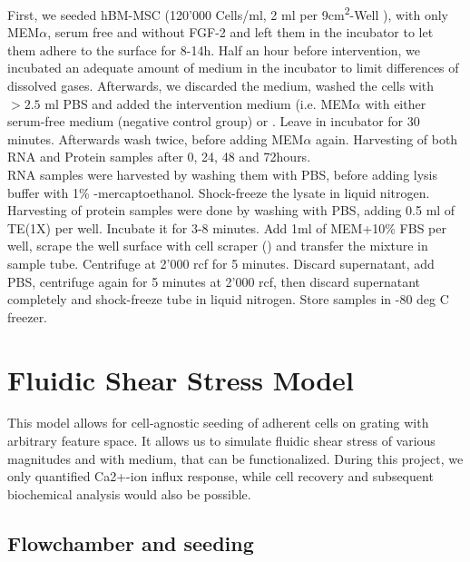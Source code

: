First, we seeded hBM-MSC (120'000 Cells/ml, 2 ml per 9cm\textsuperscript{2}-Well ), with only MEM$\alpha$, serum free and without FGF-2 and left them in the incubator  to let them adhere to the surface for 8-14h. Half an hour before intervention, we incubated an adequate amount of medium in the incubator to limit differences of dissolved gases. Afterwards, we discarded the medium, washed the cells with $> 2.5$ ml PBS and added the intervention medium (i.e. MEM$\alpha$ with either serum-free medium (negative control group) or  \Yoda. Leave in incubator for 30 minutes. Afterwards wash twice, before adding MEM$\alpha$ again. Harvesting of both RNA and Protein samples after 0, 24, 48 and 72hours.\\ 
RNA samples were harvested by washing them with PBS, before adding lysis buffer with 1\% \textbeta-mercaptoethanol. Shock-freeze the lysate in liquid nitrogen. Harvesting of protein samples were done by washing with PBS, adding 0.5 ml of TE(1X) per well. Incubate it for 3-8 minutes. Add 1ml of MEM\textalpha{ }+10\% FBS per well, scrape the well surface with cell scraper () and transfer the mixture in sample tube. Centrifuge at 2'000 rcf for 5 minutes. Discard supernatant, add PBS, centrifuge again for 5 minutes at 2'000 rcf, then discard supernatant completely and shock-freeze tube in liquid nitrogen. Store samples in -80 deg C freezer.


\section{Fluidic Shear Stress Model}

This model allows for cell-agnostic seeding of adherent cells on grating with arbitrary feature space. It allows us to simulate fluidic shear stress of various magnitudes and with medium, that can be functionalized. During this project, we only quantified Ca2+-ion influx response, while cell recovery and subsequent biochemical analysis would also be possible. 

\subsection{Flowchamber and seeding}

